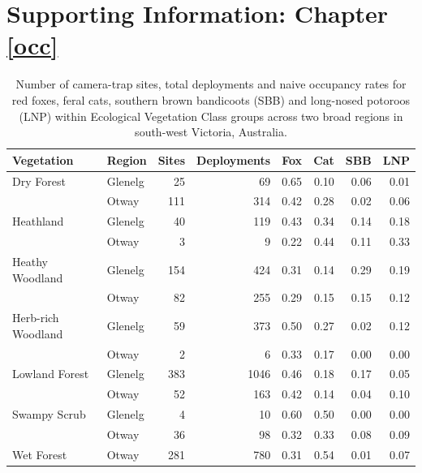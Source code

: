 \documentclass[11pt,a4paper,titlepage,twoside,openright]{style/unimelbthesis}
\begin{document}
\begin{mainmatter}
\hypertarget{occ-app}{%
\chapter{Supporting Information: Chapter \ref{occ}}\label{occ-app}}

\newpage

\begingroup\fontsize{10}{12}\selectfont
\begin{longtable}[t]{llrrrrrr}
\caption{\label{tab:occ-naive}Number of camera-trap sites, total deployments and naive occupancy rates for red foxes, feral cats, southern brown bandicoots (SBB) and long-nosed potoroos (LNP) within Ecological Vegetation Class groups across two broad regions in south-west Victoria, Australia.}\\
\toprule
Vegetation & Region & Sites & Deployments & Fox & Cat & SBB & LNP\\
\midrule
Dry Forest & Glenelg & 25 & 69 & 0.65 & 0.10 & 0.06 & 0.01\\
 & Otway & 111 & 314 & 0.42 & 0.28 & 0.02 & 0.06\\
Heathland & Glenelg & 40 & 119 & 0.43 & 0.34 & 0.14 & 0.18\\
 & Otway & 3 & 9 & 0.22 & 0.44 & 0.11 & 0.33\\
Heathy Woodland & Glenelg & 154 & 424 & 0.31 & 0.14 & 0.29 & 0.19\\
\addlinespace
 & Otway & 82 & 255 & 0.29 & 0.15 & 0.15 & 0.12\\
Herb-rich Woodland & Glenelg & 59 & 373 & 0.50 & 0.27 & 0.02 & 0.12\\
 & Otway & 2 & 6 & 0.33 & 0.17 & 0.00 & 0.00\\
Lowland Forest & Glenelg & 383 & 1046 & 0.46 & 0.18 & 0.17 & 0.05\\
 & Otway & 52 & 163 & 0.42 & 0.14 & 0.04 & 0.10\\
\addlinespace
Swampy Scrub & Glenelg & 4 & 10 & 0.60 & 0.50 & 0.00 & 0.00\\
 & Otway & 36 & 98 & 0.32 & 0.33 & 0.08 & 0.09\\
Wet Forest & Otway & 281 & 780 & 0.31 & 0.54 & 0.01 & 0.07\\
\bottomrule
\end{longtable}
\endgroup{}

\newpage
\begin{figure}


\end{figure}
\end{mainmatter}
\end{document}
